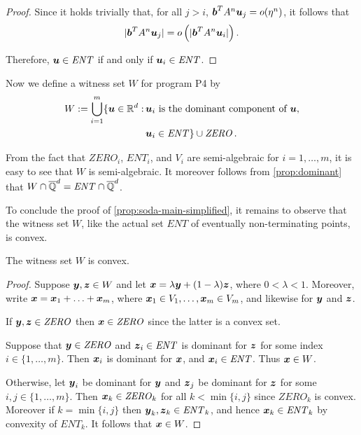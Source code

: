 \begin{proof}
Since it holds trivially that, for all $j>i$, $\boldsymbol{b}^{T} A^{n} \boldsymbol{u}_{j} = o(\eta^{n})$, it follows that
\begin{equation*}
  \lvert \boldsymbol{b}^T A^{n}\boldsymbol{u}_{j} \rvert = o\left(\lvert\boldsymbol{b}^{T} A^{n}
  \boldsymbol{u}_{i} \rvert\right).
\end{equation*}

Therefore, $\boldsymbol{u} \in \mathit{ENT}$ if and only if $\boldsymbol{u}_{i} \in \mathit{ENT}$.
\end{proof}

Now we define a witness set $W$ for program \textsf{P4} by
\begin{align*}
W :=   \bigcup_{i=1}^m \{\boldsymbol{u}\in \mathbb{R}^{d}: \,
         & \boldsymbol{u}_i \mbox{ is the dominant component of } \boldsymbol{u},\\
         & \boldsymbol{u}_i \in \mathit{ENT} \}
\cup \mathit{ZERO} \, .
\end{align*}

From the fact that $\mathit{ZERO}_i$, $\mathit{ENT}_i$, and $V_i$ are
semi-algebraic for $i=1,\ldots,m$, it is easy to see that $W$ is
semi-algebraic.  It moreover follows from \cref{prop:dominant}
that $W \cap \overline{\mathbb{Q}}^{d} = \mathit{ENT} \cap \overline{\mathbb{Q}}^{d}$.

To conclude the proof of \cref{prop:soda-main-simplified}, it
remains to observe that the witness set $W$, like the actual set
$\mathit{ENT}$ of eventually non-terminating points, is convex.
\begin{proposition}
The witness set $W$ is convex.
\end{proposition}
\begin{proof}
  Suppose $\boldsymbol y,\boldsymbol z\in W$ and let $\boldsymbol
  x=\lambda\boldsymbol y+(1-\lambda)\boldsymbol z$, where $0 < \lambda
  < 1$. Moreover, write
  $\boldsymbol{x}=\boldsymbol{x}_1+\ldots+\boldsymbol{x}_m$, where
  $\boldsymbol{x}_1\in V_1,\ldots,\boldsymbol{x}_m\in V_m$, and
  likewise for $\boldsymbol{y}$ and $\boldsymbol{z}$.

If $\boldsymbol{y},\boldsymbol{z}\in \mathit{ZERO}$ then
$\boldsymbol{x}\in \mathit{ZERO}$ since the latter is a convex set.

Suppose that $\boldsymbol{y}\in \mathit{ZERO}$ and $\boldsymbol{z}_i \in \mathit{ENT}$ is dominant for $\boldsymbol{z}$ for some index $i\in\{1,\ldots,m\}$.
Then $\boldsymbol{x}_i$ is dominant for $\boldsymbol{x}$, and
$\boldsymbol{x}_i \in \mathit{ENT}$.  Thus $\boldsymbol{x}\in W$.

Otherwise, let $\boldsymbol y_i$ be dominant for $\boldsymbol y$ and
$\boldsymbol z_j$ be dominant for $\boldsymbol z$ for some
$i,j\in\{1,\ldots,m\}$.  Then $\boldsymbol x_k\in \mathit{ZERO}_k$ for
all $k<\min\lbrace i,j\rbrace$ since $\mathit{ZERO}_k$ is convex.
Moreover if $k=\min\lbrace i,j\rbrace$ then $\boldsymbol
y_k,\boldsymbol z_k \in \mathit{ENT}_k$, and hence $\boldsymbol x_k
\in \mathit{ENT}_k$ by convexity of $\mathit{ENT}_k$.  It follows that
$\boldsymbol{x}\in W$.
\end{proof}

